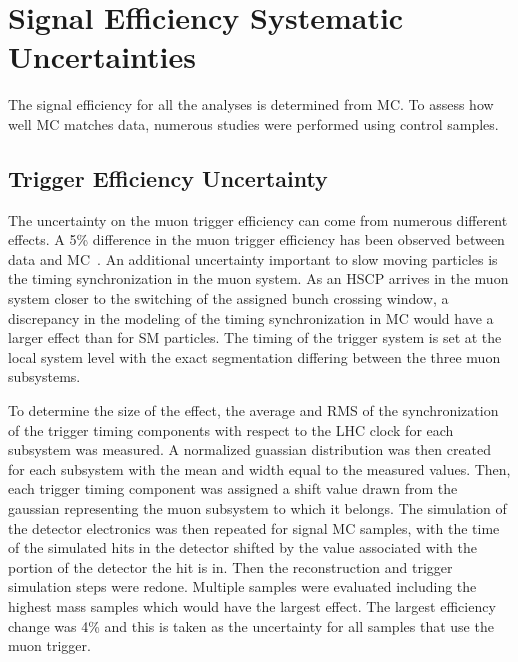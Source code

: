 \section{Signal Efficiency Systematic Uncertainties \label{sec:SystUnc}}

The signal efficiency for all the analyses is determined from MC. To assess how well MC matches data, numerous studies were performed using control samples.

\subsection{Trigger Efficiency Uncertainty}


The uncertainty on the muon trigger efficiency can come from numerous different effects. 
A 5\% difference in the muon trigger efficiency has been observed between data and MC~\cite{2012JInst...7P0002T}.
An additional uncertainty important to slow moving particles is the timing synchronization in the muon system. As an HSCP arrives in the muon system
closer to the switching of the assigned bunch crossing window, a discrepancy in the modeling of the timing synchronization in MC would have a larger effect than for SM particles.
The timing of the trigger system is set at the local system level with the
exact segmentation differing between the three muon subsystems.

To determine the size of the effect, the average and RMS of the synchronization of the trigger timing components with respect to the LHC clock
for each subsystem was measured.
A normalized guassian distribution was then created for each subsystem with the mean and width equal to the measured values.
Then, each trigger timing component was
assigned a shift value drawn from the gaussian representing the muon subsystem to which it belongs. The simulation of the detector electronics was then repeated
for signal MC samples, with
the time of the simulated hits in the detector shifted by the value associated with the portion of the detector the hit is in. Then the reconstruction and trigger
simulation steps were redone. 
Multiple samples were evaluated including the highest mass samples which would have the largest effect.
The largest efficiency change was 4\% and this is taken as the uncertainty for all samples that use the muon trigger.

